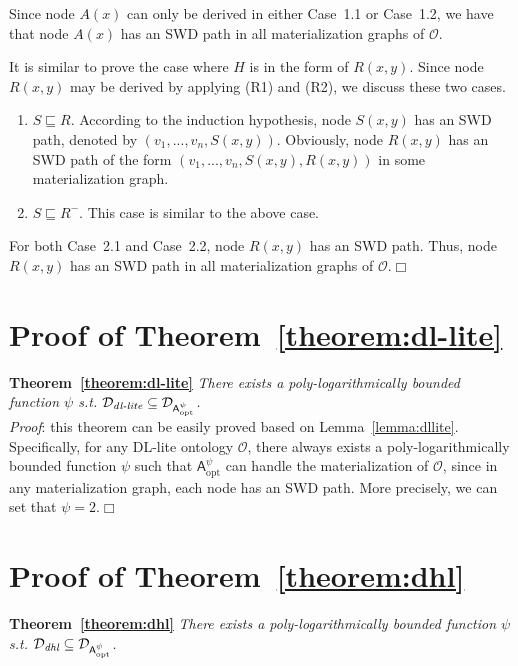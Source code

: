 Since node $A(x)$ can only be derived in either Case~1.1
or Case~1.2, we have that
node $A(x)$ has an SWD path in all materialization graphs of $\mathcal{O}$.

It is similar to prove the case where $H$ is in the form of $R(x,y)$.
Since node $R(x,y)$ may be derived by
applying (R1) and (R2), we discuss these two cases.

\begin{enumerate}[leftmargin=12ex,label=Case~2.\arabic*]
\item $S\sqsubseteq R$. According to the induction hypothesis,
node $S(x,y)$ has an SWD path, denoted by $(v_1,...,v_n,S(x,y))$.
Obviously, node $R(x,y)$
has an SWD path of the form $(v_1,...,v_n,S(x,y),R(x,y))$
in some materialization graph.

\item $S\sqsubseteq R^-$. This case is similar to
the above case.
\end{enumerate}

For both Case~2.1 and Case~2.2, node $R(x,y)$ has an SWD path. Thus,
node $R(x,y)$ has an SWD path in all materialization graphs of $\mathcal{O}$.\hfill$\Box$

\section{Proof of Theorem~\ref{theorem:dl-lite}}

\textbf{Theorem~\ref{theorem:dl-lite}}
\emph{There exists a poly-logarithmically bounded function $\psi$ s.t.
$\mathcal{D}_{\textit{\text{dl-lite}}}\subseteq\mathcal{D}_{\mathsf{A}_{\text{opt}}^{\psi}}$.}\\

\noindent\emph{Proof}: this theorem can be easily proved based on Lemma~\ref{lemma:dllite}.
Specifically, for any DL-lite ontology $\mathcal{O}$,
there always exists a poly-logarithmically bounded function $\psi$ such that
$\mathsf{A}_{\text{opt}}^{\psi}$ can handle the materialization of $\mathcal{O}$,
since in any materialization graph, each node has an SWD path.
More precisely, we can set that $\psi=2$.\hfill$\Box$


\section{Proof of Theorem~\ref{theorem:dhl}}

\textbf{Theorem~\ref{theorem:dhl}}
\emph{There exists a poly-logarithmically bounded function $\psi$ s.t.
$\mathcal{D}_{\textit{\text{dhl}}}\subseteq\mathcal{D}_{\mathsf{A}_{\text{opt}}^{\psi}}$.}\\


